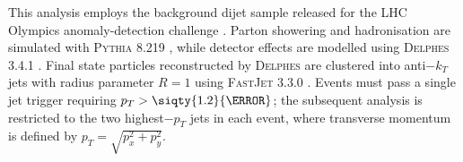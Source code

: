             This analysis employs the background dijet sample released for the LHC Olympics anomaly-detection challenge \cite{Kasieczka:2021xcg,kasieczka_rd_2019}.
            Parton showering and hadronisation are simulated with \textsc{Pythia} 8.219 \cite{Sjostrand:2007gs}, while detector effects are modelled using \textsc{Delphes} 3.4.1 \cite{DeFavereau2014DELPHESExperiment,Mertens:2015kba}.
            Final state particles reconstructed by \textsc{Delphes} are clustered into anti$-k_T$ jets with radius parameter $R=1$ using \textsc{FastJet} 3.3.0 \cite{Cacciari:2008gp,Cacciari2008TheAlgorithm,Cacciari2012FastJetManual}.
            Events must pass a single jet trigger requiring $p_T>\siqty{1.2}{\TeV}$;
            the subsequent analysis is restricted to the two highest$-p_T$ jets in each event, where transverse momentum is defined by $p_T=\sqrt{p_x^{2}+p_y^{2}}$.
